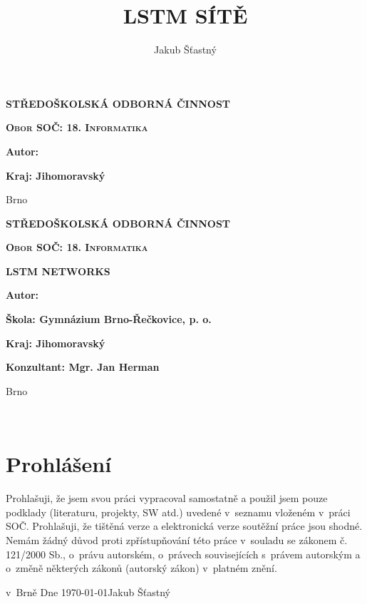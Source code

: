 \documentclass[a4paper]{article}
\title{LSTM SÍTĚ}\let\Title\@title
\author{Jakub Šťastný}\let\Author\@author
\newcommand{\enTitle}{LSTM NETWORKS}
\begin{document}
\begin{titlepage}
	\centering
	\textbf{{\LARGE STŘEDOŠKOLSKÁ ODBORNÁ ČINNOST}}\par
	\vspace{0.5cm}
	\textbf{{\scshape\Large Obor SOČ: 18. Informatika}}\par
	\vfill
	\textbf{\LARGE \Title}\par
	\vspace{4cm}
	\textbf{\Large Autor: \Author}\par
	\vspace{1cm}
	\textbf{\Large Kraj: Jihomoravský}\par
	\vfill
	{\large Brno \the\year\par}
\end{titlepage}
\begin{titlepage}
        \centering
        \textbf{{\LARGE STŘEDOŠKOLSKÁ ODBORNÁ ČINNOST}}\par
        \vspace{0.5cm}
        \textbf{{\scshape\Large Obor SOČ: 18. Informatika}}\par
        \vfill
	\textbf{\LARGE \Title}\par\textbf{\Large \enTitle}\par
        \vspace{4cm}
        \textbf{\Large Autor: \Author}\par
        \vspace{1cm}
	\textbf{\Large Škola: Gymnázium Brno-Řečkovice, p. o.}\par
	\vspace{1cm}
        \textbf{\Large Kraj: Jihomoravský}\par
	\vspace{1cm}
	\textbf{\Large Konzultant: Mgr. Jan Herman}\par
        \vfill
	{\large Brno \the\year\par}
\end{titlepage}
\thispagestyle{empty}
${}$
\vfill
\section*{Prohlášení}
Prohlašuji, že jsem svou práci vypracoval samostatně a použil jsem pouze podklady (literaturu, projekty, SW atd.) uvedené v~seznamu vloženém v~práci SOČ. Prohlašuji, že tištěná verze a elektronická verze soutěžní práce jsou shodné. Nemám žádný důvod proti zpřístupňování této práce v~souladu se zákonem č. 121/2000 Sb., o~právu autorském, o~právech souvisejících s~právem autorským a o~změně některých zákonů (autorský zákon) v~platném znění.\par
v~Brně Dne \today \hfill Jakub Šťastný\par
\clearpage
\thispagestyle{empty}
${}$
\vfill
\end{document}
